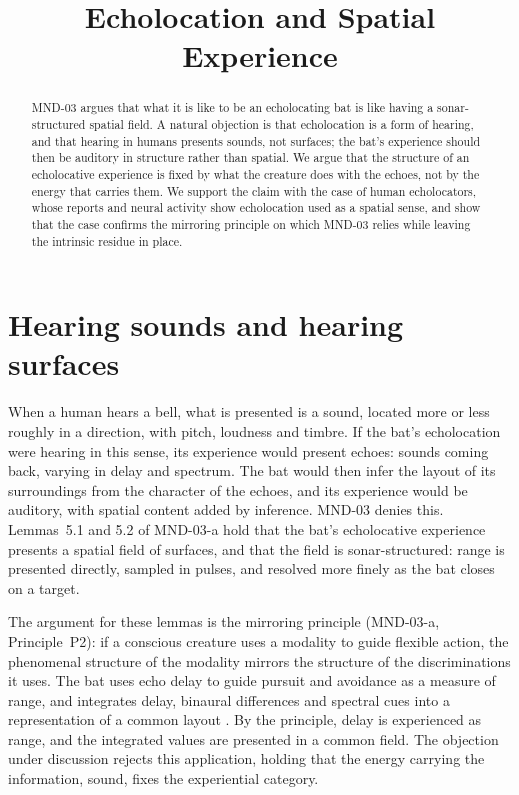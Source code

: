 \documentclass{situationist-preprint}
\title{Echolocation and Spatial Experience}
\begin{document}
\maketitle

\begin{abstract}
MND-03 argues that what it is like to be an echolocating bat is like having a sonar-structured spatial field. A natural objection is that echolocation is a form of hearing, and that hearing in humans presents sounds, not surfaces; the bat's experience should then be auditory in structure rather than spatial. We argue that the structure of an echolocative experience is fixed by what the creature does with the echoes, not by the energy that carries them. We support the claim with the case of human echolocators, whose reports and neural activity show echolocation used as a spatial sense, and show that the case confirms the mirroring principle on which MND-03 relies while leaving the intrinsic residue in place.
\end{abstract}

\section{Hearing sounds and hearing surfaces}

When a human hears a bell, what is presented is a sound, located more or less roughly in a direction, with pitch, loudness and timbre. If the bat's echolocation were hearing in this sense, its experience would present echoes: sounds coming back, varying in delay and spectrum. The bat would then infer the layout of its surroundings from the character of the echoes, and its experience would be auditory, with spatial content added by inference. MND-03 denies this. Lemmas~5.1 and 5.2 of MND-03-a hold that the bat's echolocative experience presents a spatial field of surfaces, and that the field is sonar-structured: range is presented directly, sampled in pulses, and resolved more finely as the bat closes on a target.

The argument for these lemmas is the mirroring principle (MND-03-a, Principle~P2): if a conscious creature uses a modality to guide flexible action, the phenomenal structure of the modality mirrors the structure of the discriminations it uses. The bat uses echo delay to guide pursuit and avoidance as a measure of range, and integrates delay, binaural differences and spectral cues into a representation of a common layout \citep{Griffin1958,Simmons1989}. By the principle, delay is experienced as range, and the integrated values are presented in a common field. The objection under discussion rejects this application, holding that the energy carrying the information, sound, fixes the experiential category.
\end{document}
